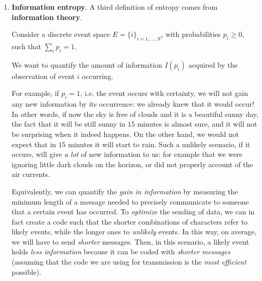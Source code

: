 \documentclass[../../main.tex]{subfiles}
\begin{document}
\begin{enumerate}
    \item \textbf{Information entropy}.  
    A third definition of entropy comes from \textbf{information theory}.

    Consider a discrete event space $E = \{i\}_{i=1,\dots, N}$, with probabilities $p_i \geq 0$, such that $\sum_i p_i = 1$.

    We want to quantify the amount of information $I(p_i)$ acquired by the observation of event $i$ occurring. 

    For example, if $p_i=1$, i.e. the event occurs with certainty, we will not gain any new information by its occurrence: we already knew that it would occur! In other words, if now the sky is free of clouds and it is a beautiful sunny day, the fact that it will be still sunny in $15$ minutes is almost sure, and it will not be surprising when it indeed happens. On the other hand, we would not expect that in $15$ minutes it will start to rain. Such a unlikely scenario, if it occurs, will give \textit{a lot} of new information to us: for example that we were ignoring little dark clouds on the horizon, or did not properly account of the air currents.  

    Equivalently, we can quantify the \textit{gain in information} by measuring the minimum length of a message needed to precisely communicate to someone that a certain event has occurred. To \textit{optimize} the sending of data, we can in fact create a code such that the shorter combinations of characters refer to likely events, while the longer ones to \textit{unlikely} events. In this way, on average, we will have to send \textit{shorter} messages. Then, in this scenario, a likely event holds \textit{less information} because it can be coded with \textit{shorter messages} (assuming that the code we are using for transmission is the \textit{most efficient} possible).

    \medskip


\end{enumerate}
\end{document}
